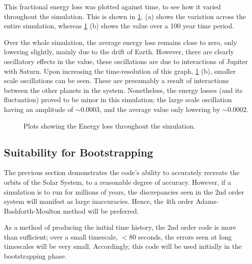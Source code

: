 \documentclass[a4paper,10pt]{article}
\begin{document}
This fractional energy loss was plotted against time, to see how it varied throughout the simulation. This is shown in \cref{Energy}.  (a) shows the variation across the entire simulation, whereas \cref{Energy} (b) shows the value over a 100 year time period. 

Over the whole simulation, the average energy loss remains close to zero, only lowering slightly, mainly due to the drift of Earth. However, there are clearly oscillatory effects in the value, these oscillations are due to interactions of Jupiter with Saturn. Upon increasing the time-resolution of this graph, \cref{Energy} (b), smaller scale oscillations can be seen. These are presumably a result of interactions between the other planets in the system. Nonetheless, the energy losses (and its fluctuation) proved to be minor in this simulation; the large scale oscillation having an amplitude of $\sim 0.0003$, and the average value only lowering by $\sim 0.0002$.

\begin{figure}[h!]
    \centering
    \qquad
    \caption{Plots showing the Energy loss throughout the simulation.}%
    \label{Energy}%
\end{figure}

\subsection{Suitability for Bootstrapping}\label{Suitable}

The previous section demonstrates the code's ability to accurately recreate the orbits of the Solar System, to a reasonable degree of accuracy. However, if a simulation is to run for millions of years, the discrepancies seen in the 2nd order system will manifest as large inaccuracies. Hence, the 4th order Adams-Bashforth-Moulton method will be preferred.

As a method of producing the initial time history, the 2nd order code is more than sufficient; over a small timescale, $<80$ seconds, the errors seen at long timescales will be very small. Accordingly, this code will be used initially in the bootstrapping phase.   \pagebreak
\end{document}
